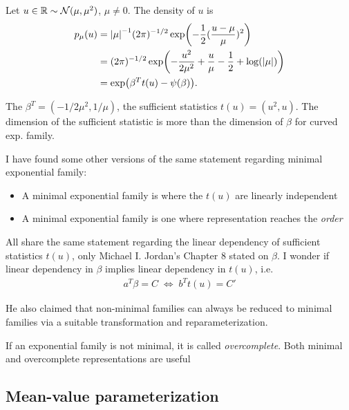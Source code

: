 \begin{example}
    Let $u \in \mathbb{R} \sim \mathcal{N}(\mu, \mu^2)$, $\mu \not=0$. The density of $u$ is
    \begin{align*}
        p_\mu(u) 
        &= \abs{\mu}^{-1}(2\pi)^{-1/2} \exp(-\frac{1}{2}(\frac{u-\mu}{\mu})^2) \\
        &= (2\pi)^{-1/2} \exp(-\frac{u^2}{2\mu^2} + \frac{u}{\mu} - \frac{1}{2} + \log(\abs{\mu})) \\
        &= \exp(\beta^T t(u) - \psi(\beta)).
    \end{align*}

    The $\beta^T = (-1/2\mu^2, 1/\mu)$, 
    the sufficient statistics $t(u) = (u^2, u)$. 
    The dimension of the sufficient statistic is more than the dimension of $\beta$ for curved exp. family.
\end{example}




I have found some other versions of the same statement regarding minimal exponential family:
\begin{itemize}
    \item A minimal exponential family is where the $t(u)$ are linearly independent
    \item A minimal exponential family is one where representation reaches the \emph{order}
\end{itemize}

All share the same statement regarding the linear dependency of sufficient statistics $t(u)$,
only Michael I. Jordan's Chapter 8 stated on $\beta$. 
I wonder if linear dependency in $\beta$ implies linear dependency in $t(u)$, i.e.
\begin{align*}
    a^T \beta = C \; \Leftrightarrow \; b^Tt(u) = C'
\end{align*}

He also claimed that non-minimal families can always be reduced to minimal families 
via a suitable transformation and reparameterization.
 
If an exponential family is not minimal, it is
called \emph{overcomplete}. Both minimal and overcomplete representations are useful



\subsection{Mean-value parameterization}

